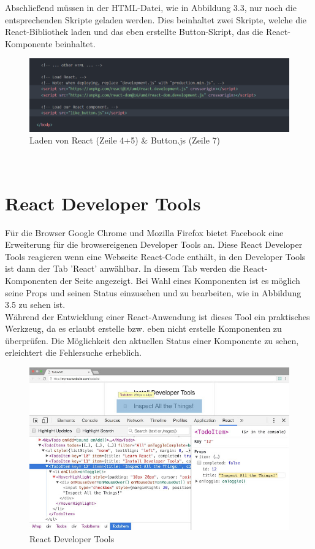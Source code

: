Abschließend müssen in der HTML-Datei, wie in Abbildung 3.3, nur noch die entsprechenden Skripte geladen werden. Dies beinhaltet zwei Skripte, welche die React-Bibliothek laden und das eben erstellte Button-Skript, das die React-Komponente beinhaltet.
\begin{figure}[ht]
     \centerline{\includegraphics[width=14cm]{../Abbildungen/scriptLines.png}}
  \caption{Laden von React (Zeile 4+5) \& Button.js (Zeile 7) \cite{eig}}
  \label{fig1_1}
\end{figure}\\
\clearpage
\section{React Developer Tools}
Für die Browser Google Chrome und Mozilla Firefox bietet Facebook eine Erweiterung für die browsereigenen Developer Tools an. Diese React Developer Tools reagieren wenn eine Webseite React-Code enthält, in den Developer Tools ist dann der Tab 'React' anwählbar. In diesem Tab werden die React-Komponenten der Seite angezeigt. Bei Wahl eines Komponenten ist es möglich seine Props und seinen Status einzusehen und zu bearbeiten, wie in Abbildung 3.5 zu sehen ist.\\
Während der Entwicklung einer React-Anwendung ist dieses Tool ein praktisches Werkzeug, da es erlaubt erstelle bzw. eben nicht erstelle Komponenten zu überprüfen. Die Möglichkeit den aktuellen Status einer Komponente zu sehen, erleichtert die Fehlersuche erheblich. \\
\begin{figure}[H]
     \centerline{\includegraphics[width=14cm]{../Abbildungen/devTools.png}}
  \caption{React Developer Tools}
  \label{fig1_1}
\end{figure}